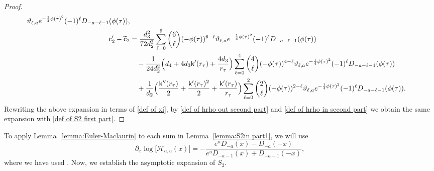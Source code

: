 \documentclass[reqno]{amsart}
\newcommand{\1}{\mathds{1}}
\numberwithin{equation}{section}
\theoremstyle{definition}
\begin{document}
\begin{proof}
\begin{align*}
\vartheta_{\ell,a}e^{-\frac{1}{4}\phi(\tau)^2}
(-1)^{\ell}D_{-a-\ell-1}(\phi(\tau)), 
\\
\mathsf{c}_2'-\widetilde{\mathsf{c}}_2
&=
\frac{d_3^2}{72d_2^3}
\sum_{\ell=0}^{6}\binom{6}{\ell}(-\phi(\tau))^{6-\ell}
\vartheta_{\ell,a}e^{-\frac{1}{4}\phi(\tau)^2}
(-1)^{\ell}D_{-a-\ell-1}(\phi(\tau))
\\
&\quad
-
\frac{1}{24d_2^2}\Bigl(d_4+4d_3\mathsf{k}'(r_{\tau})+\frac{4d_3}{r_{\tau}}\Bigr)
\sum_{\ell=0}^{4}\binom{4}{\ell}(-\phi(\tau))^{4-\ell}
\vartheta_{\ell,a}e^{-\frac{1}{4}\phi(\tau)^2} 
(-1)^{\ell}D_{-a-\ell-1}(\phi(\tau))
\\
&\quad
+
\frac{1}{d_2}\Bigl(\frac{\mathsf{k}''(r_{\tau})}{2}+\frac{\mathsf{k}'(r_{\tau})^2}{2}+\frac{\mathsf{k}'(r_{\tau})}{r_{\tau}}\Bigr)
\sum_{\ell=0}^{2}\binom{2}{\ell}(-\phi(\tau))^{2-\ell}
\vartheta_{\ell,a}e^{-\frac{1}{4}\phi(\tau)^2}
(-1)^{\ell}D_{-a-\ell-1}(\phi(\tau)). 
\end{align*}
Rewriting the above expansion in terms of \eqref{def of xi}, by \eqref{def of hrho out second part} and \eqref{def of hrho in second part} we obtain the same expansion with \eqref{def of S2 first part}.  

\end{proof}
To apply Lemma~\ref{lemma:Euler-Maclaurin} to each sum in Lemma~\ref{lemma:S2in part1}, we will use
\begin{equation}
\label{def of d relationship between g0 g1}
\partial_x\log\bigl[\mathcal{H}_{a,u}(x)\bigr]
=
-\frac{e^{u}D_{-a}(x)-D_{-a}(-x)}{e^uD_{-a-1}(x)+D_{-a-1}(-x)},
\end{equation}
where we have used \cite[Subsections~12.8 and~12.9]{NIST}.
Now, we establish the asymptotic expansion of $S_2$. 
\end{document}
